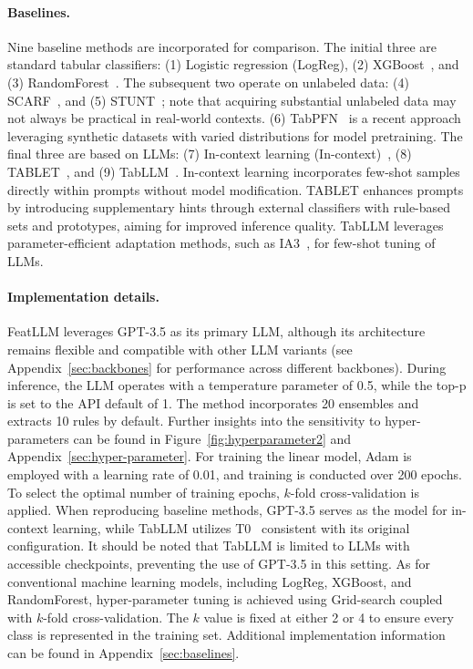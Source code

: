 \paragraph{Baselines.}
Nine baseline methods are incorporated for comparison. The initial three are standard tabular classifiers: (1) Logistic regression (LogReg), (2) XGBoost~\cite{chen2016xgboost}, and (3) RandomForest~\cite{ho1995random}. The subsequent two operate on unlabeled data: (4) SCARF~\cite{bahri2022scarf}, and (5) STUNT~\cite{nam2023stunt}; note that acquiring substantial unlabeled data may not always be practical in real-world contexts. (6) TabPFN~\cite{hollmann2022tabpfn} is a recent approach leveraging synthetic datasets with varied distributions for model pretraining. The final three are based on LLMs: (7) In-context learning (In-context)~\cite{wei2022emergent}, (8) TABLET~\cite{slack2023tablet}, and (9) TabLLM~\cite{hegselmann2023tabllm}. In-context learning incorporates few-shot samples directly within prompts without model modification. TABLET enhances prompts by introducing supplementary hints through external classifiers with rule-based sets and prototypes, aiming for improved inference quality. TabLLM leverages parameter-efficient adaptation methods, such as IA3~\cite{liu2022few}, for few-shot tuning of LLMs.

\vspace*{-0.12in}
\paragraph{Implementation details.}
\textsf{FeatLLM} leverages GPT-3.5 as its primary LLM, although its architecture remains flexible and compatible with other LLM variants (see Appendix~\ref{sec:backbones} for performance across different backbones). During inference, the LLM operates with a temperature parameter of 0.5, while the top-p is set to the API default of 1. The method incorporates 20 ensembles and extracts 10 rules by default. Further insights into the sensitivity to hyper-parameters can be found in Figure~\ref{fig:hyperparameter2} and Appendix~\ref{sec:hyper-parameter}.
For training the linear model, Adam is employed with a learning rate of 0.01, and training is conducted over 200 epochs. To select the optimal number of training epochs, $k$-fold cross-validation is applied. When reproducing baseline methods, GPT-3.5 serves as the model for in-context learning, while TabLLM utilizes T0~\cite{sanh2022multitask} consistent with its original configuration. It should be noted that TabLLM is limited to LLMs with accessible checkpoints, preventing the use of GPT-3.5 in this setting. As for conventional machine learning models, including LogReg, XGBoost, and RandomForest, hyper-parameter tuning is achieved using Grid-search coupled with $k$-fold cross-validation. The $k$ value is fixed at either 2 or 4 to ensure every class is represented in the training set. Additional implementation information can be found in Appendix~\ref{sec:baselines}.

